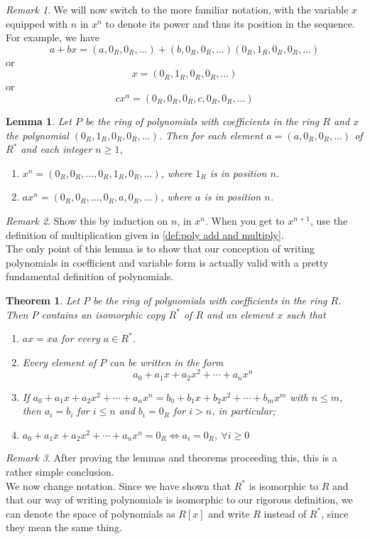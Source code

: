 \documentclass{article}
\newtheorem{theorem}{Theorem}[section]
\newtheorem{lemma}{Lemma}[section]
\theoremstyle{definition}
\theoremstyle{remark}
\newtheorem{remark}{Remark}[section]
\begin{document}
\begin{remark}
We will now switch to the more familiar notation, with the variable $x$ equipped with $n$ in $x^n$ 
to denote its power and thus its position in the sequence. For example, we have 
\[
a+bx = (a, 0_R, 0_R, \dots) + (b, 0_R, 0_R, \dots )(0_R, 1_R, 0_R, 0_R, \dots )
\]
or \[
x = (0_R, 1_R, 0_R, 0_R, \dots )
\]
or \[
cx^n = (0_R, 0_R, 0_R, c, 0_R, 0_R, \dots)
\]
\end{remark}

\begin{lemma}
Let $P$ be the ring of polynomials with coefficients in the ring $R$ and $x$ 
the polynomial $(0_R, 1_R, 0_R, 0_R, \dots )$. Then 
for each element $a=(a, 0_R, 0_R, \dots )$ of $R^*$ and each 
integer $n\geq 1$, 
\begin{enumerate}
    \item $x^n = (0_R, 0_R, \dots, 0_R, 1_R, 0_R, \dots )$, where $1_R$ is in position $n$.
    \item $ax^n = (0_R, 0_R, \dots, 0_R, a, 0_R, \dots)$, where $a$ is in position $n$. 
\end{enumerate}
\end{lemma}

\begin{remark}
Show this by induction on $n$, in $x^n$. When you get to $x^{n+1}$, use the definition of 
multiplication given in \ref{def:poly add and multiply}. \\
The only point of this lemma is to show that our conception of writing polynomials 
in coefficient and variable form is actually valid with a pretty fundamental definition 
of polynomials. 
\end{remark}



\begin{theorem}
Let $P$ be the ring of polynomials with coefficients in the ring $R$. Then $P$
contains an isomorphic copy $R^*$ of $R$ and an element $x$ such that 
\begin{enumerate}
\item $ax = xa$ for every $a \in R^*$.
\item Every element of $P$ can be written in the form \[
a_0 + a_1 x + a_2 x^2 + \cdots + a_n x^n
\]
\item If $a_0 + a_1 x + a_2 x^2 + \cdots + a_n x^n = b_0 + b_1 x + b_2 x^2 + \cdots + b_m x^m$ with $n \leq m$, 
then $a_i = b_i$ for $i \leq n$ and $b_i = 0_R$ for $i > n$, in particular;
\item $a_0 + a_1 x + a_2 x^2 + \cdots + a_n x^n = 0_R \iff a_i = 0_R, \ \forall i \geq 0$ 
\end{enumerate}
\end{theorem}
\begin{remark}
After proving the lemmas and theorems proceeding this, this is a rather simple conclusion. \\
We now change notation. Since we have shown that $R^*$ is isomorphic to $R$ and that our 
way of writing polynomials is isomorphic to our rigorous definition, we can denote the space of polynomials as $R[x]$
and write $R$ instead of $R^*$, since they mean the same thing. 
\end{remark}
\end{document}
